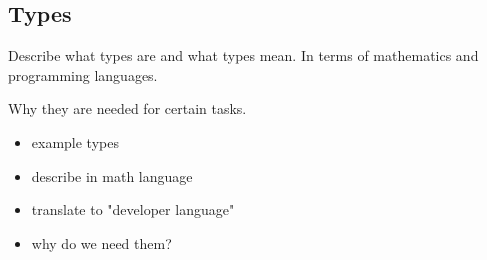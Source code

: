 \subsection{Types}

Describe what types are and what types mean.
In terms of mathematics and programming languages.

Why they are needed for certain tasks.

\begin{itemize}
    \item example types
    \item describe in math language
    \item translate to "developer language"
    \item why do we need them?
\end{itemize}

